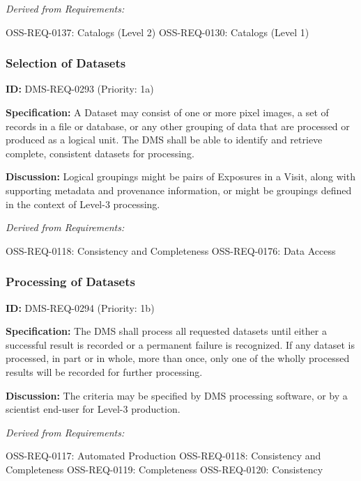 \documentclass[SE,toc,lsstdraft]{lsstdoc}
\begin{document}
\emph{Derived from Requirements:}

OSS-REQ-0137:
Catalogs (Level 2) \newline
OSS-REQ-0130:
Catalogs (Level 1) \newline

\subsubsection{Selection of Datasets}

\label{DMS-REQ-0293}
\textbf{ID:} DMS-REQ-0293 (Priority: 1a)

\textbf{Specification:} A Dataset may consist of one or more pixel images, a set of records in a file or database, or any other grouping of data that are processed or produced as a logical unit. The DMS shall be able to identify and retrieve complete, consistent datasets for processing.

\textbf{Discussion: }Logical groupings might be pairs of Exposures in a Visit, along with supporting metadata and provenance information, or might be groupings defined in the context of Level-3 processing.

\emph{Derived from Requirements:}

OSS-REQ-0118:
Consistency and Completeness \newline
OSS-REQ-0176:
Data Access \newline

\subsubsection{Processing of Datasets}

\label{DMS-REQ-0294}
\textbf{ID:} DMS-REQ-0294 (Priority: 1b)

\textbf{Specification:} The DMS shall process all requested datasets until either a successful result is recorded or a permanent failure is recognized. If any dataset is processed, in part or in whole, more than once, only one of the wholly processed results will be recorded for further processing.

\textbf{Discussion: }The criteria may be specified by DMS processing software, or by a scientist end-user for Level-3 production.

\emph{Derived from Requirements:}

OSS-REQ-0117:
Automated Production \newline
OSS-REQ-0118:
Consistency and Completeness \newline
OSS-REQ-0119:
Completeness \newline
OSS-REQ-0120:
Consistency \newline
\end{document}
